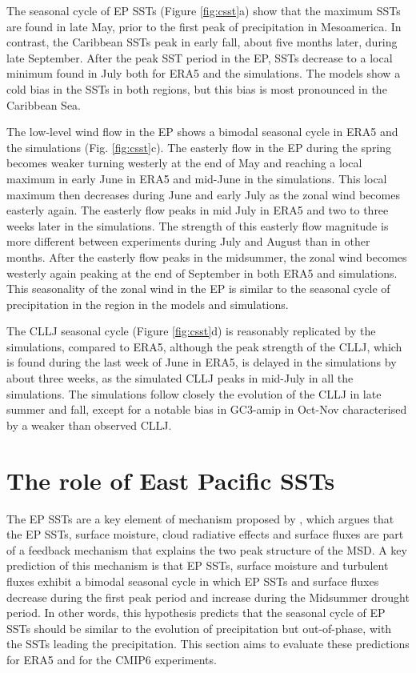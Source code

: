 The seasonal cycle of EP SSTs (Figure \ref{fig:csst}a) show that the maximum SSTs are found in late May, prior to the first peak of precipitation in Mesoamerica. In contrast, the Caribbean SSTs peak in early fall, about five months later, during late September. After the peak SST period in the EP, SSTs decrease to a local minimum found in July both for ERA5 and the simulations. The models show a cold bias in the SSTs in both regions, but this bias is most pronounced in the Caribbean Sea.

 The low-level wind flow in the EP shows a bimodal seasonal cycle in ERA5 and the simulations (Fig. \ref{fig:csst}c).
The easterly flow in the EP during the spring becomes weaker turning westerly at the end of May and reaching a local maximum in early June in ERA5 and mid-June in the simulations. This local maximum then decreases during June and early July as the zonal wind becomes easterly again. The easterly flow peaks in mid July in ERA5 and two to three weeks later in the simulations. The strength of this easterly flow magnitude  is more different between experiments during July and August than in other months. 
After the easterly flow peaks in the midsummer, the zonal wind becomes westerly again peaking at the end of September in both ERA5 and simulations. 
This seasonality of the zonal wind in the EP is similar to the seasonal cycle of precipitation in the region in the models and simulations. %

The CLLJ seasonal cycle (Figure \ref{fig:csst}d) is reasonably replicated by the simulations, compared to ERA5, although the peak strength of the CLLJ, which is found during the last week of June in ERA5, is delayed in the simulations by about three weeks, as the simulated CLLJ peaks in mid-July in all the simulations.
The simulations follow closely the evolution of the CLLJ in late summer and fall, except for a notable bias in GC3-amip in Oct-Nov characterised by a weaker than observed CLLJ.

\section{The role of East Pacific SSTs}

 The EP SSTs are a key element of mechanism proposed by \cite{magana1999}, which argues that the EP SSTs, surface moisture, cloud radiative effects and surface fluxes are part of a feedback mechanism that explains the two peak structure of the MSD. A key prediction of this mechanism is that EP SSTs, surface moisture and turbulent fluxes exhibit a bimodal  seasonal cycle in which EP SSTs and surface fluxes decrease during the first peak period and increase during the Midsummer drought period. In other words, this hypothesis predicts that the seasonal cycle of EP SSTs should be similar to the evolution of precipitation but out-of-phase, with the SSTs leading the precipitation. This section aims to evaluate these predictions for ERA5 and for the CMIP6 experiments. 

